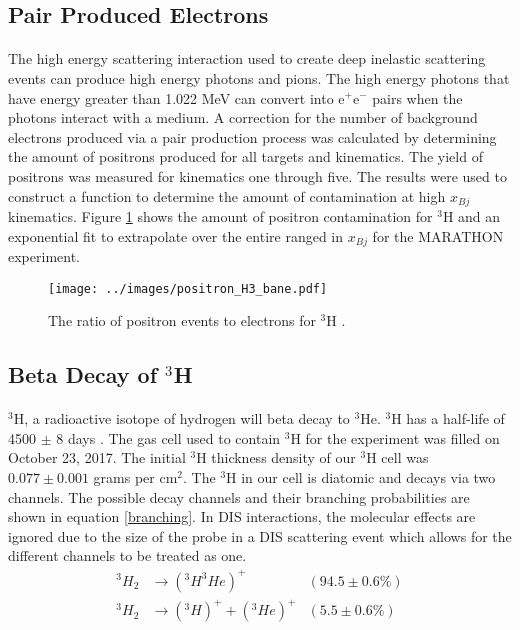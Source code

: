 \subsection{Pair Produced Electrons}
\paragraph{} The high energy scattering interaction used to create deep inelastic scattering events can produce high energy photons and pions. The high energy photons that have energy greater than 1.022 MeV can convert into e$^+$e$^-$ pairs when the photons interact with a medium. A correction for the number of background electrons produced via a pair production process was calculated by determining the amount of positrons produced for all targets and kinematics. The yield of positrons was measured for kinematics one through five. The results were used to construct a function to determine the amount of contamination at high $x_{Bj}$ kinematics. Figure \ref{PC} shows the amount of positron contamination for $^3$H and an exponential fit to extrapolate over the entire ranged in $x_{Bj}$ for the MARATHON experiment. 

\begin{figure}[t]
	\centering

	\texttt{[image: ../images/positron\_H3\_bane.pdf]}
	
	\caption{The ratio of positron events to electrons for $^3$H \cite{tongsu}. }
	\label{PC}
\end{figure}

\subsection{Beta Decay of $^3$H}
\paragraph{} $^3$H, a radioactive isotope of hydrogen will beta decay to $^3$He. $^3$H has a half-life of 4500 $\pm$ 8 days \cite{T2HL}. The gas cell used to contain $^3$H for the experiment was filled on October 23, 2017. The initial $^3$H thickness density of our $^3$H cell was $0.077 \pm 0.001 $ grams per cm$^2$. The $^3$H in our cell is diatomic and decays via two channels\cite{diaT}. The possible decay channels and their branching probabilities are shown in equation \ref{branching}. In DIS interactions, the molecular effects are ignored due to the size of the probe in a DIS scattering event which allows for the different channels to be treated as one. 
\begin{align}
			^3H_2 &\rightarrow(^3H ^3He)^+  &(94.5 \pm 0.6\%) \nonumber \\ 
			^3H_2 &\rightarrow(^3H)^+ + (^3He)^+  & (5.5 \pm 0.6\%) 
			\label{branching}
\end{align}
